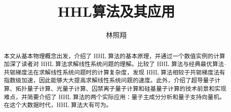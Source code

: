 \documentclass[aps,prl,twocolumn,groupedaddress]{revtex4-2}
\begin{document}

\title{HHL算法及其应用}


\author{林照翔}


\begin{abstract}
本文从基本物理概念出发，介绍了 HHL 算法的基本原理，并通过一个数值实例的计算加深了读者对 HHL 算法求解线性系统问题的理解。比较了 HHL 算法与经典最优算法--共轭梯度法在求解线性系统问题时的计算复杂度，发现 HHL 算法相较于共轭梯度法有指数级加速，因此能够大大提高求解线性系统问题的速度。此外，介绍了超导量子计算、拓扑量子计算、光量子计算、囚禁离子量子计算和硅基量子计算的技术前景和实现难点，并简要介绍了 HHL 算法的两个实际应用：量子主成分分析和量子支持向量机。在这个大数据时代，HHL 算法大有可为。
\end{abstract}


\maketitle
\end{document}
